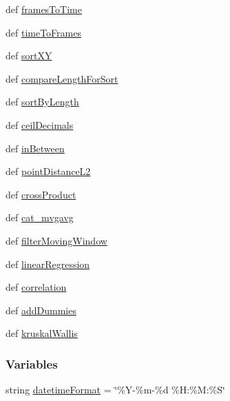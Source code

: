 \begin{DoxyCompactItemize}
\item 
def \hyperlink{namespaceutils_a990c96ba49a1ac6b3ad3d3df47bda437}{frames\-To\-Time}
\item 
def \hyperlink{namespaceutils_af8793fedc46289b60d631576157df718}{time\-To\-Frames}
\item 
def \hyperlink{namespaceutils_a91ced40c7e478757d960914de6d2f423}{sort\-X\-Y}
\item 
def \hyperlink{namespaceutils_acaaa34f9add80ced3f95658eda40c15c}{compare\-Length\-For\-Sort}
\item 
def \hyperlink{namespaceutils_a53b90e530e8f03a89dab67fd68c47952}{sort\-By\-Length}
\item 
def \hyperlink{namespaceutils_a3b3e7613413abce401363863684b9696}{ceil\-Decimals}
\item 
def \hyperlink{namespaceutils_a1324554c5e199ddef378015dc9250185}{in\-Between}
\item 
def \hyperlink{namespaceutils_a84f8c169f5d97b4333102a566d7c2c9b}{point\-Distance\-L2}
\item 
def \hyperlink{namespaceutils_ace6bdff381dca6da71769d46d55cd560}{cross\-Product}
\item 
def \hyperlink{namespaceutils_a5adf55cc50347d994fe924973b12357a}{cat\-\_\-mvgavg}
\item 
def \hyperlink{namespaceutils_a29241a39d6f3e4dde4e95971d2b2f463}{filter\-Moving\-Window}
\item 
def \hyperlink{namespaceutils_a19b4d573d118b31f6c3e83d31d4e1470}{linear\-Regression}
\item 
def \hyperlink{namespaceutils_aa869d4f3a848530390ee26a3d4ad437d}{correlation}
\item 
def \hyperlink{namespaceutils_a3441a4983d6b1dd8062e312cbe40ff1f}{add\-Dummies}
\item 
def \hyperlink{namespaceutils_a01948f8f46258829042d38787c1c5984}{kruskal\-Wallis}
\end{DoxyCompactItemize}
\subsubsection*{Variables}
\begin{DoxyCompactItemize}
\item 
string \hyperlink{namespaceutils_a40726aeb86a30013172c8fe371f5bd2c}{datetime\-Format} = \char`\"{}\%Y-\/\%m-\/\%d \%H\-:\%M\-:\%S\char`\"{}
\end{DoxyCompactItemize}


